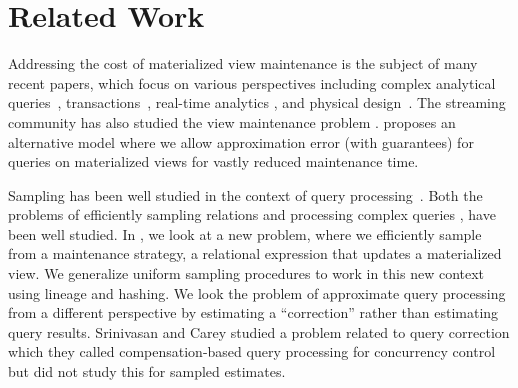 \vspace{-1em}
\section{Related Work}\label{related}
\vspace{-.3em}

Addressing the cost of materialized view maintenance is the subject of many recent papers, which
focus on various perspectives including complex analytical queries~\cite{nikolic2014linview}, transactions~\cite{bailis2014scalable}, real-time analytics \cite{liarou2012monetdb}, and physical design~\cite{lefevre2014opportunistic}.
The streaming community has also studied the view maintenance problem \cite{abadi2003aurora,golab2012scalable, he2010comet, ghanem2010supporting, KrishnamurthyFDFGLT10}. 
\svc proposes an alternative model where we allow approximation error (with guarantees) for queries on materialized views for vastly reduced maintenance time.


Sampling has been well studied in the context of query processing~\cite{AgarwalMPMMS13, olken1993random, garofalakis2001approximate}. 
Both the problems of efficiently sampling relations \cite{olken1993random} and processing complex queries \cite{agarwalknowing}, have been well studied. 
In \svc, we look at a new problem, where we efficiently sample from a maintenance strategy, a relational expression that updates a materialized view.
We generalize uniform sampling procedures to work in this new context using lineage \cite{DBLP:journals/vldb/CuiW03} and hashing.
We look the problem of approximate query processing \cite{AgarwalMPMMS13, agarwalknowing} from a different perspective by estimating a ``correction'' rather than estimating query results. 
Srinivasan and Carey studied a problem related to query correction which they called compensation-based query processing \cite{srinivasanC92} for concurrency control but did not study this for sampled estimates.

